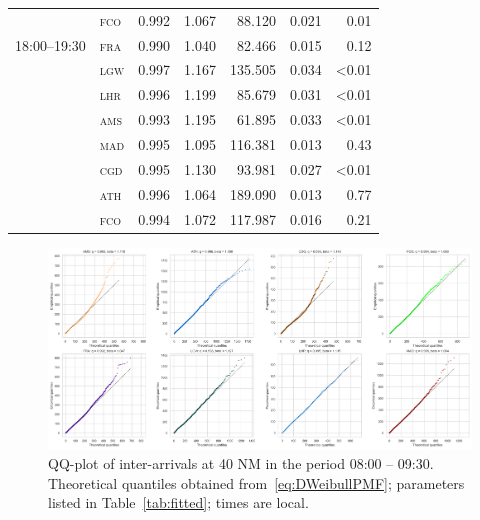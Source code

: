 \documentclass[final,review]{elsarticle}
\newcommand{\airp}[1]{\textcolor{#1}{\textsc{#1}}}
\begin{document}
\begin{table}
\begin{tabular}{llrrrrr}
                   & \airp{fco} & 0.992 &   1.067 &  88.120 &     0.021 &      0.01 \\
      18:00--19:30 & \airp{fra} & 0.990 &   1.040 &  82.466 &     0.015 &      0.12 \\
                   & \airp{lgw} & 0.997 &   1.167 & 135.505 &     0.034 &     <0.01 \\
                   & \airp{lhr} & 0.996 &   1.199 &  85.679 &     0.031 &     <0.01 \\
                   & \airp{ams} & 0.993 &   1.195 &  61.895 &     0.033 &     <0.01 \\
                   & \airp{mad} & 0.995 &   1.095 & 116.381 &     0.013 &      0.43 \\
                   & \airp{cgd} & 0.995 &   1.130 &  93.981 &     0.027 &     <0.01 \\
                   & \airp{ath} & 0.996 &   1.064 & 189.090 &     0.013 &      0.77 \\
                   & \airp{fco} & 0.994 &   1.072 & 117.987 &     0.016 &      0.21 \\
      \bottomrule
    \end{tabular}
\end{table}

\begin{figure}
    \includegraphics[width=\textwidth]{IA_qqplot0800-0930}
    \caption{QQ-plot of inter-arrivals at 40 NM in the period 08:00 -- 09:30. Theoretical quantiles obtained from~\eqref{eq:DWeibullPMF}; parameters listed in Table~\ref{tab:fitted}; times are local.}
    \label{fig:qqplot5-8}
\end{figure}
\end{document}
